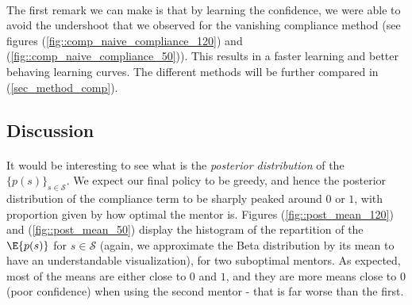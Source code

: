 \documentclass[a4paper]{report}
\begin{document}
{{{{			\paragraph{} The first remark we can make is that by learning the confidence, we were able to avoid the undershoot that we observed for the vanishing compliance method (see figures (\ref{fig::comp_naive_compliance_120}) and (\ref{fig::comp_naive_compliance_50})). This results in a faster learning and better behaving learning curves. The different methods will be further compared in (\ref{sec_method_comp}). 
			}
			\subsection{Discussion}
			{
				\paragraph{} It would be interesting to see what is the \emph{posterior distribution} of the $\{p(s)\}_{s\in\mathcal{S}}$. We expect our final policy to be greedy, and hence the posterior distribution of the compliance term to be sharply peaked around $0$ or $1$, with proportion given by how optimal the mentor is. Figures (\ref{fig::post_mean_120}) and (\ref{fig::post_mean_50}) display the histogram of the repartition of the $\E{p(s)}$ for $s\in\mathcal{S}$ (again, we approximate the Beta distribution by its mean to have an understandable visualization), for two suboptimal mentors. As expected, most of the means are either close to $0$ and $1$, and they are more means close to 0 (poor confidence) when using the second mentor - that is far worse than the first. 
				
}}}}
\end{document}
